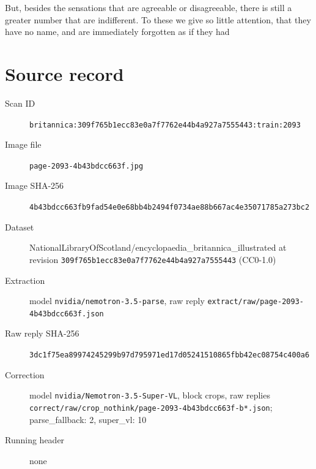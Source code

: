 \documentclass{article}
\begin{document}
But, besides the sensations that are agreeable or disagreeable, there is still a greater number that are indifferent. To these we give so little attention, that they have no name, and are immediately forgotten as if they had


\section*{Source record}
\begin{description}
\item[Scan ID] \texttt{britannica:309f765b1ecc83e0a7f7762e44b4a927a7555443:train:2093}
\item[Image file] \texttt{page-2093-4b43bdcc663f.jpg}
\item[Image SHA-256] \texttt{4b43bdcc663fb9fad54e0e68bb4b2494f0734ae88b667ac4e35071785a273bc2}
\item[Dataset] NationalLibraryOfScotland/encyclopaedia\_britannica\_illustrated at revision \texttt{309f765b1ecc83e0a7f7762e44b4a927a7555443} (CC0-1.0)
\item[Extraction] model \texttt{nvidia/nemotron-3.5-parse}, raw reply \texttt{extract/raw/page-2093-4b43bdcc663f.json}
\item[Raw reply SHA-256] \texttt{3dc1f75ea89974245299b97d795971ed17d05241510865fbb42ec08754c400a6}
\item[Correction] model \texttt{nvidia/Nemotron-3.5-Super-VL}, block crops, raw replies \texttt{correct/raw/crop\_nothink/page-2093-4b43bdcc663f-b*.json}; parse\_fallback: 2, super\_vl: 10
\item[Running header] none
\end{description}
\end{document}
